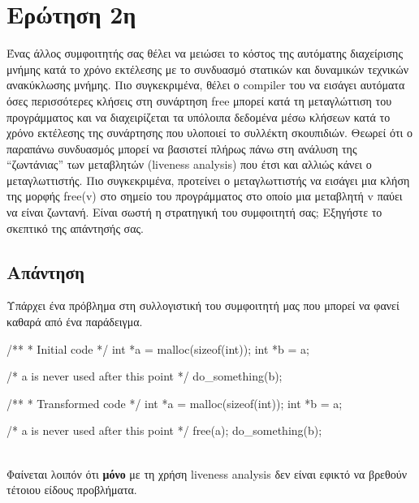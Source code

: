 \documentclass[a4paper]{article}
\begin{document}
\section*{Ερώτηση 2η}
Ένας άλλος συμφοιτητής σας θέλει να μειώσει το κόστος της αυτόματης διαχείρισης μνήμης κατά
το χρόνο εκτέλεσης με το συνδυασμό στατικών και δυναμικών τεχνικών ανακύκλωσης μνήμης.
Πιο συγκεκριμένα, θέλει ο \foreignlanguage{english}{compiler} του να εισάγει αυτόματα όσες περισσότερες κλήσεις στη συνάρτηση \foreignlanguage{english}{free} μπορεί κατά τη μεταγλώττιση του προγράμματος και να διαχειρίζεται τα υπόλοιπα
δεδομένα μέσω κλήσεων κατά το χρόνο εκτέλεσης της συνάρτησης που υλοποιεί το συλλέκτη
σκουπιδιών. Θεωρεί ότι ο παραπάνω συνδυασμός μπορεί να βασιστεί πλήρως πάνω στη ανάλυση
της “ζωντάνιας” των μεταβλητών (\foreignlanguage{english}{liveness analysis}) που έτσι και αλλιώς κάνει ο μεταγλωττιστής.
Πιο συγκεκριμένα, προτείνει ο μεταγλωττιστής να εισάγει μια κλήση της μορφής \foreignlanguage{english}{free(v)} στο
σημείο του προγράμματος στο οποίο μια μεταβλητή \foreignlanguage{english}{v} παύει να είναι ζωντανή. Είναι σωστή η στρατηγική του συμφοιτητή σας; Εξηγήστε το σκεπτικό της απάντησής σας.

\subsection*{Απάντηση}
Υπάρχει ένα πρόβλημα στη συλλογιστική του συμφοιτητή μας που μπορεί να φανεί καθαρά από ένα παράδειγμα.

\begin{otherlanguage}{english}
\begin{code}[frame=single]  
/**
 * Initial code
 */
int *a = malloc(sizeof(int));
int *b = a;

/* a is never used after this point */
do_something(b);
\end{code}

\begin{code}[frame=single]  
/**
 * Transformed code
 */
int *a = malloc(sizeof(int));
int *b = a;

/* a is never used after this point */
free(a);
do_something(b);

\end{code}
\end{otherlanguage}
\\
Φαίνεται λοιπόν ότι \textbf{μόνο} με τη χρήση \foreignlanguage{english}{liveness analysis} δεν είναι εφικτό να βρεθούν τέτοιου είδους προβλήματα. 
\end{document}
